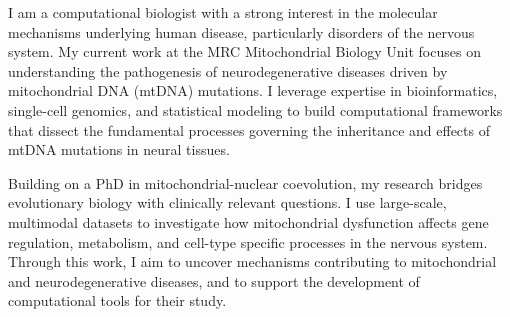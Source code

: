 
\begin{cvparagraph}
I am a computational biologist with a strong interest in the molecular mechanisms underlying human disease, particularly disorders of the nervous system. My current work at the MRC Mitochondrial Biology Unit focuses on understanding the pathogenesis of neurodegenerative diseases driven by mitochondrial DNA (mtDNA) mutations. I leverage expertise in bioinformatics, single-cell genomics, and statistical modeling to build computational frameworks that dissect the fundamental processes governing the inheritance and effects of mtDNA mutations in neural tissues.

Building on a PhD in mitochondrial-nuclear coevolution, my research bridges evolutionary biology with clinically relevant questions. I use large-scale, multimodal datasets to investigate how mitochondrial dysfunction affects gene regulation, metabolism, and cell-type specific processes in the nervous system. Through this work, I aim to uncover mechanisms contributing to mitochondrial and neurodegenerative diseases, and to support the development of computational tools for their study.
\end{cvparagraph}